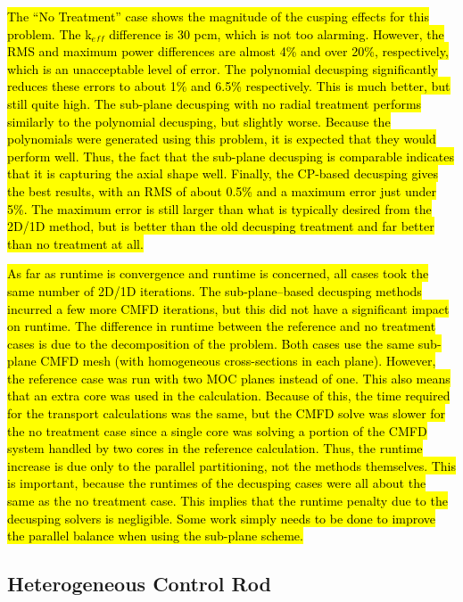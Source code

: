 \hl{The ``No Treatment'' case shows the magnitude of the cusping effects for this problem.  The k$_{eff}$ difference is 30 pcm, which is not too alarming.  However, the RMS and maximum power differences are almost 4\% and over 20\%, respectively, which is an unacceptable level of error.  The polynomial decusping significantly reduces these errors to about 1\% and 6.5\% respectively.  This is much better, but still quite high.  The sub-plane decusping with no radial treatment performs similarly to the polynomial decusping, but slightly worse.  Because the polynomials were generated using this problem, it is expected that they would perform well.  Thus, the fact that the sub-plane decusping is comparable indicates that it is capturing the axial shape well.  Finally, the CP-based decusping gives the best results, with an RMS of about 0.5\% and a maximum error just under 5\%.  The maximum error is still larger than what is typically desired from the 2D/1D method, but is better than the old decusping treatment and far better than no treatment at all.}

\hl{As far as runtime is convergence and runtime is concerned, all cases took the same number of 2D/1D iterations.  The sub-plane--based decusping methods incurred a few more CMFD iterations, but this did not have a significant impact on runtime.  The difference in runtime between the reference and no treatment cases is due to the decomposition of the problem.  Both cases use the same sub-plane CMFD mesh (with homogeneous cross-sections in each plane).  However, the reference case was run with two MOC planes instead of one.  This also means that an extra core was used in the calculation.  Because of this, the time required for the transport calculations was the same, but the CMFD solve was slower for the no treatment case since a single core was solving a portion of the CMFD system handled by two cores in the reference calculation.  Thus, the runtime increase is due only to the parallel partitioning, not the methods themselves.  This is important, because the runtimes of the decusping cases were all about the same as the no treatment case.  This implies that the runtime penalty due to the decusping solvers is negligible.  Some work simply needs to be done to improve the parallel balance when using the sub-plane scheme.}

\subsection{Heterogeneous Control Rod}

